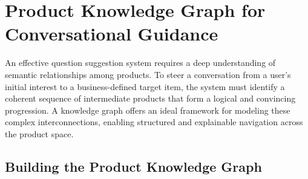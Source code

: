 \section{Product Knowledge Graph for Conversational Guidance}\label{sec:knowledge_graph}

An effective question suggestion system requires a deep understanding of semantic relationships among products. To steer a conversation from a user’s initial interest to a business-defined target item, the system must identify a coherent sequence of intermediate products that form a logical and convincing progression. A knowledge graph offers an ideal framework for modeling these complex interconnections, enabling structured and explainable navigation across the product space.



\subsection{Building the Product Knowledge Graph}



